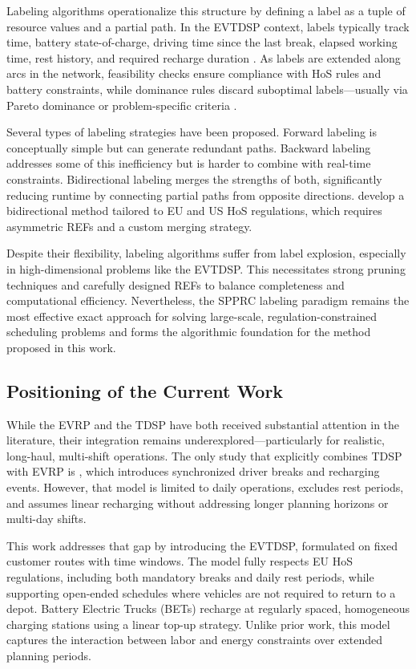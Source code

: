 \documentclass[trsc,dblanonrev]{informs4}
\begin{document}
Labeling algorithms operationalize this structure by defining a label as a tuple of resource values and a partial path. In the EVTDSP context, labels typically track time, battery state-of-charge, driving time since the last break, elapsed working time, rest history, and required recharge duration \citep{goel2017exact}. As labels are extended along arcs in the network, feasibility checks ensure compliance with HoS rules and battery constraints, while dominance rules discard suboptimal labels—usually via Pareto dominance or problem-specific criteria \citep{desaulniers2016exact}.

Several types of labeling strategies have been proposed. Forward labeling is conceptually simple but can generate redundant paths. Backward labeling addresses some of this inefficiency but is harder to combine with real-time constraints. Bidirectional labeling merges the strengths of both, significantly reducing runtime by connecting partial paths from opposite directions. \citet{tilk2020bidirectional} develop a bidirectional method tailored to EU and US HoS regulations, which requires asymmetric REFs and a custom merging strategy.

Despite their flexibility, labeling algorithms suffer from label explosion, especially in high-dimensional problems like the EVTDSP. This necessitates strong pruning techniques and carefully designed REFs to balance completeness and computational efficiency. Nevertheless, the SPPRC labeling paradigm remains the most effective exact approach for solving large-scale, regulation-constrained scheduling problems and forms the algorithmic foundation for the method proposed in this work.


\subsection{Positioning of the Current Work}

While the EVRP and the TDSP have both received substantial attention in the literature, their integration remains underexplored—particularly for realistic, long-haul, multi-shift operations. The only study that explicitly combines TDSP with EVRP is \citet{schiffer2017impact}, which introduces synchronized driver breaks and recharging events. However, that model is limited to daily operations, excludes rest periods, and assumes linear recharging without addressing longer planning horizons or multi-day shifts.

This work addresses that gap by introducing the EVTDSP, formulated on fixed customer routes with time windows. The model fully respects EU HoS regulations, including both mandatory breaks and daily rest periods, while supporting open-ended schedules where vehicles are not required to return to a depot. Battery Electric Trucks (BETs) recharge at regularly spaced, homogeneous charging stations using a linear top-up strategy. Unlike prior work, this model captures the interaction between labor and energy constraints over extended planning periods.
\end{document}
